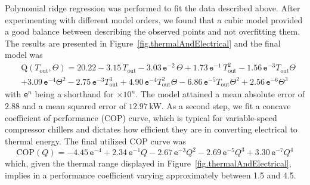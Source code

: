 Polynomial ridge regression was performed to fit the data described above. After experimenting with different model orders, we found that a cubic model provided a good balance between describing the observed points and not overfitting them. The results are presented in Figure~\ref{fig.thermalAndElectrical} and the final model was
\begin{align}
	&\text{Q}(T_\text{out},\Theta) = 20.22 -3.15 \, T_\text{out} - 3.03 \,\texttt{e}^{-2} \, \Theta + 1.73\,\texttt{e}^{-1} \, T_\text{out}^2 - 1.56\,\texttt{e}^{-3} T_\text{out} \Theta \nonumber \\
	& + 3.09\,\texttt{e}^{-4} \Theta^2 - 2.75\,\texttt{e}^{-3} T_\text{out}^3 + 4.90 \,\texttt{e}^{-4} T_\text{out}^2 \Theta - 6.86 \,\texttt{e}^{-5} T_\text{out} \Theta^2 + 2.56 \,\texttt{e}^{-6}\Theta^3  \label{eq.thermalEnergy} 
\end{align}
with \texttt{e}$^{n}$ being a shorthand for $\times10^{n}$. The model attained a mean absolute error of $2.88$ and a mean squared error of $12.97\,$kW. As a second step, we fit a concave coefficient of performance (COP) curve, which is typical for variable-speed compressor chillers and dictates how efficient they are in converting electrical to thermal energy. The final utilized COP curve was
\begin{equation}
		\text{COP}(Q) =  - 4.45 \, \texttt{e}^{-4}  + 2.34 \, \texttt{e}^{-1} Q - 2.67 \, \texttt{e}^{-3} Q^2 - 2.69 \, \texttt{e}^{-5} Q^3 + 3.30 \, \texttt{e}^{-7} Q^4
		\label{eq.COP}
\end{equation}
which, given the thermal range displayed in Figure~\ref{fig.thermalAndElectrical}, implies in a performance coefficient varying approximately between 1.5 and 4.5.

